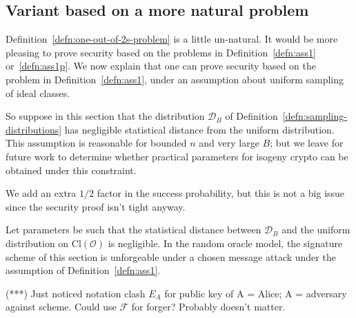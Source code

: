 \documentclass{llncs}
\newcommand{\D}{\mathcal{D}}
\newcommand{\FF}{\mathcal{F}}
\newcommand{\OO}{\mathcal{O}}
\newcommand{\Cl}{\text{Cl}}
\begin{document}
\subsection{Variant based on a more natural problem}


Definition~\ref{defn:one-out-of-2s-problem}  is a little un-natural.
It would be more pleasing to prove security based on the problems in Definition~\ref{defn:ass1} or~\ref{defn:ass1p}.
We now explain that one can prove security based on the problem in Definition~\ref{defn:ass1}, under an assumption about uniform sampling of ideal classes.

So suppose in this section that the distribution $\D_B$ of Definition~\ref{defn:sampling-distributions} has negligible statistical distance from the uniform distribution.
This assumption is reasonable for bounded $n$ and very large $B$; but we leave for future work to determine whether practical parameters for isogeny crypto can be obtained under this constraint.


We add an extra $1/2$ factor in the success probability, but this is not a big issue since the security proof isn't tight anyway.


\begin{theorem}
Let parameters be such that the statistical distance between $\D_B$ and the uniform distribution on $\Cl(\OO)$ is negligible.
In the random oracle model, the signature scheme of this section is unforgeable under a chosen message attack under the assumption of Definition~\ref{defn:ass1}.
\end{theorem}


(***) Just noticed notation clash $E_A$ for public key of A = Alice; A = adversary against scheme. Could use $\FF$ for forger?  Probably doesn't matter.
\end{document}
